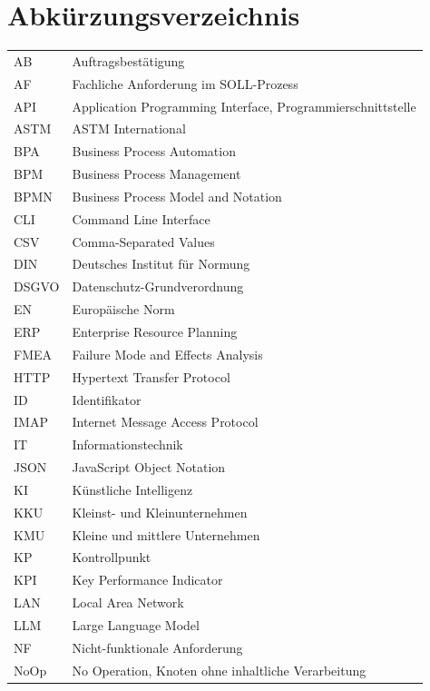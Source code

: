 \documentclass[a4paper,12pt]{article}
\begin{document}
\section*{Abkürzungsverzeichnis}
\begingroup
\renewcommand{\arraystretch}{0.88}
\begin{tabularx}{\textwidth}{@{}p{2.2cm}X@{}}
    AB & Auftragsbestätigung \\
    AF & Fachliche Anforderung im SOLL-Prozess \\
    API & Application Programming Interface, Programmierschnittstelle \\
    ASTM & ASTM International \\
    BPA & Business Process Automation \\
    BPM & Business Process Management \\
    BPMN & Business Process Model and Notation \\
    CLI & Command Line Interface \\
    CSV & Comma-Separated Values \\
    DIN & Deutsches Institut für Normung \\
    DSGVO & Datenschutz-Grundverordnung \\
    EN & Europäische Norm \\
    ERP & Enterprise Resource Planning \\
    FMEA & Failure Mode and Effects Analysis \\
    HTTP & Hypertext Transfer Protocol \\
    ID & Identifikator \\
    IMAP & Internet Message Access Protocol \\
    IT & Informationstechnik \\
    JSON & JavaScript Object Notation \\
    KI & Künstliche Intelligenz \\
    KKU & Kleinst- und Kleinunternehmen \\
    KMU & Kleine und mittlere Unternehmen \\
    KP & Kontrollpunkt \\
    KPI & Key Performance Indicator \\
    LAN & Local Area Network \\
    LLM & Large Language Model \\
    NF & Nicht-funktionale Anforderung \\
    NoOp & No Operation, Knoten ohne inhaltliche Verarbeitung \\

\end{tabularx}
\end{document}
